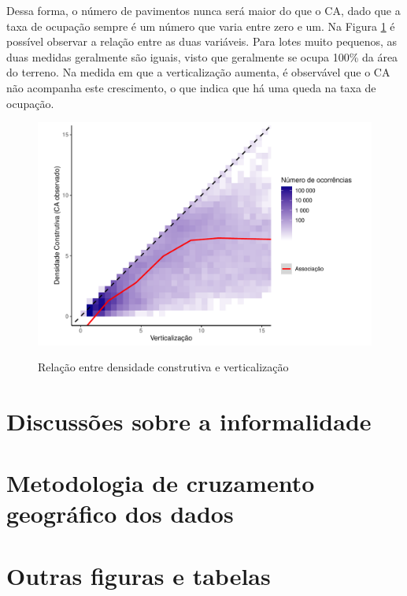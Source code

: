 \begin{apendicesenv}
Dessa forma, o número de pavimentos nunca será maior do que o CA, dado que a taxa de ocupação sempre é um número que varia entre zero e um. Na Figura \ref{fig:ca-vert} é possível observar a relação entre as duas variáveis. Para lotes muito pequenos, as duas medidas geralmente são iguais, visto que geralmente se ocupa 100\% da área do terreno. Na medida em que a verticalização aumenta, é observável que o CA não acompanha este crescimento, o que indica que há uma queda na taxa de ocupação.

\begin{figure}
    \centering
    \caption{Relação entre densidade construtiva e verticalização}
    \includegraphics[width = \textwidth]{figuras/ca_vs_verticalizacao.pdf}
    \label{fig:ca-vert}
\end{figure}

\chapter{Discussões sobre a informalidade}
\label{appendix:informalidade}


\chapter{Metodologia de cruzamento geográfico dos dados}
\label{appendix:cruzamento}


\chapter{Outras figuras e tabelas}
\label{appendix:figuras}

\clearpage


\end{apendicesenv}
